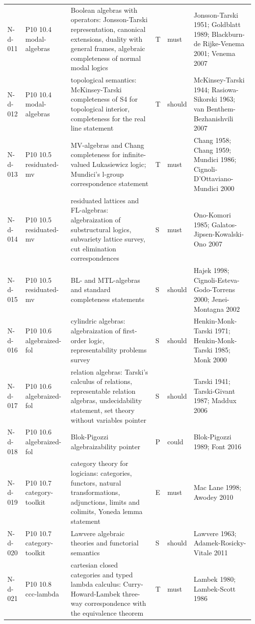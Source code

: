 \begin{longtable}{@{}p{0.52in}p{0.85in}p{2.5in}p{0.22in}p{0.42in}p{1.95in}@{}}
N-d-011 & P10 10.4 modal-algebras & Boolean algebras with operators: Jonsson-Tarski representation, canonical extensions, duality with general frames, algebraic completeness of normal modal logics & T & must & Jonsson-Tarski 1951; Goldblatt 1989; Blackburn-de Rijke-Venema 2001; Venema 2007 \\
N-d-012 & P10 10.4 modal-algebras & topological semantics: McKinsey-Tarski completeness of S4 for topological interior, completeness for the real line statement & T & should & McKinsey-Tarski 1944; Rasiowa-Sikorski 1963; van Benthem-Bezhanishvili 2007 \\
N-d-013 & P10 10.5 residuated-mv & MV-algebras and Chang completeness for infinite-valued Lukasiewicz logic; Mundici's l-group correspondence statement & T & must & Chang 1958; Chang 1959; Mundici 1986; Cignoli-D'Ottaviano-Mundici 2000 \\
N-d-014 & P10 10.5 residuated-mv & residuated lattices and FL-algebras: algebraization of substructural logics, subvariety lattice survey, cut elimination correspondences & S & must & Ono-Komori 1985; Galatos-Jipsen-Kowalski-Ono 2007 \\
N-d-015 & P10 10.5 residuated-mv & BL- and MTL-algebras and standard completeness statements & S & should & Hajek 1998; Cignoli-Esteva-Godo-Torrens 2000; Jenei-Montagna 2002 \\
N-d-016 & P10 10.6 algebraized-fol & cylindric algebras: algebraization of first-order logic, representability problems survey & S & should & Henkin-Monk-Tarski 1971; Henkin-Monk-Tarski 1985; Monk 2000 \\
N-d-017 & P10 10.6 algebraized-fol & relation algebras: Tarski's calculus of relations, representable relation algebras, undecidability statement, set theory without variables pointer & S & should & Tarski 1941; Tarski-Givant 1987; Maddux 2006 \\
N-d-018 & P10 10.6 algebraized-fol & Blok-Pigozzi algebraizability pointer & P & could & Blok-Pigozzi 1989; Font 2016 \\
N-d-019 & P10 10.7 category-toolkit & category theory for logicians: categories, functors, natural transformations, adjunctions, limits and colimits, Yoneda lemma statement & E & must & Mac Lane 1998; Awodey 2010 \\
N-d-020 & P10 10.7 category-toolkit & Lawvere algebraic theories and functorial semantics & S & should & Lawvere 1963; Adamek-Rosicky-Vitale 2011 \\
N-d-021 & P10 10.8 ccc-lambda & cartesian closed categories and typed lambda calculus: Curry-Howard-Lambek three-way correspondence with the equivalence theorem & T & must & Lambek 1980; Lambek-Scott 1986 \\

\end{longtable}
